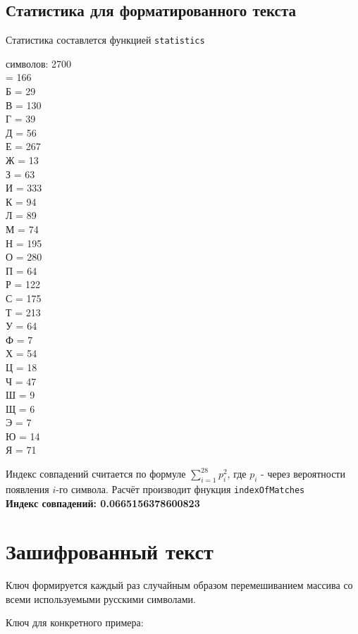 \documentclass[a4paper, 14pt]{extarticle}
\begin{document}
\subsection{Статистика для форматированного текста}

Статистика составлется функцией \texttt{statistics}

 символов: 2700\\

 = 166
\\Б = 29
\\В = 130
\\Г = 39
\\Д = 56
\\Е = 267
\\Ж = 13
\\З = 63
\\И = 333
\\К = 94
\\Л = 89
\\М = 74
\\Н = 195
\\О = 280
\\П = 64
\\Р = 122
\\С = 175
\\Т = 213
\\У = 64
\\Ф = 7
\\Х = 54
\\Ц = 18
\\Ч = 47
\\Ш = 9
\\Щ = 6
\\Э = 7
\\Ю = 14
\\Я = 71

Индекс совпадений считается по формуле $\sum^{28}_{i=1} p_i^2$, где $p_i$ - через вероятности появления $i$-го символа. Расчёт производит фнукция \texttt{indexOfMatches}\\

\textbf{Индекс совпадений: 0.0665156378600823}

\section{Зашифрованный текст}

Ключ формируется каждый раз случайным образом перемешиванием массива со всеми используемыми русскими символами.

Ключ для конкретного примера:\\
\end{document}
